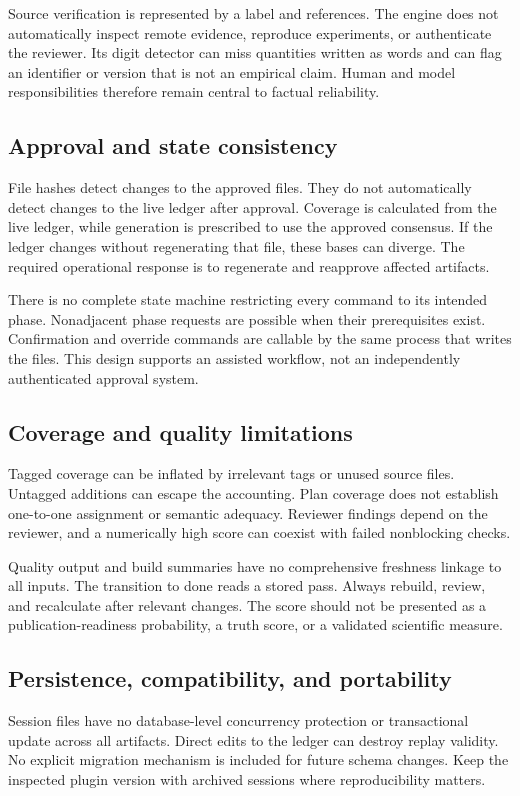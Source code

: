 \documentclass[12pt,a4paper]{article}
\begin{document}
Source verification is represented by a label and references. The engine does not automatically inspect remote evidence, reproduce experiments, or authenticate the reviewer. Its digit detector can miss quantities written as words and can flag an identifier or version that is not an empirical claim. Human and model responsibilities therefore remain central to factual reliability.

\subsection{Approval and state consistency}
File hashes detect changes to the approved files. They do not automatically detect changes to the live ledger after approval. Coverage is calculated from the live ledger, while generation is prescribed to use the approved consensus. If the ledger changes without regenerating that file, these bases can diverge. The required operational response is to regenerate and reapprove affected artifacts.

There is no complete state machine restricting every command to its intended phase. Nonadjacent phase requests are possible when their prerequisites exist. Confirmation and override commands are callable by the same process that writes the files. This design supports an assisted workflow, not an independently authenticated approval system.

\subsection{Coverage and quality limitations}
Tagged coverage can be inflated by irrelevant tags or unused source files. Untagged additions can escape the accounting. Plan coverage does not establish one-to-one assignment or semantic adequacy. Reviewer findings depend on the reviewer, and a numerically high score can coexist with failed nonblocking checks.

Quality output and build summaries have no comprehensive freshness linkage to all inputs. The transition to done reads a stored pass. Always rebuild, review, and recalculate after relevant changes. The score should not be presented as a publication-readiness probability, a truth score, or a validated scientific measure.

\subsection{Persistence, compatibility, and portability}
Session files have no database-level concurrency protection or transactional update across all artifacts. Direct edits to the ledger can destroy replay validity. No explicit migration mechanism is included for future schema changes. Keep the inspected plugin version with archived sessions where reproducibility matters.
\end{document}

